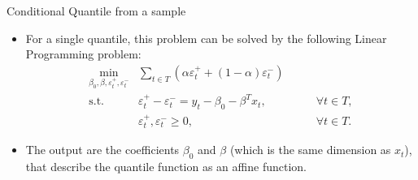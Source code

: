 \begin{frame}{Conditional Quantile from a sample}

\begin{itemize}
\tightlist
\item
  For a single quantile, this problem can be solved by the following
  Linear Programming problem: \[
  \begin{array}{lll}
   \underset{\beta_0, \beta,\varepsilon_{t}^{+}, \varepsilon_{t}^{-}}{\text{min}} & \sum_{t \in T} \left(\alpha \varepsilon_{t}^{+}+(1-\alpha)\varepsilon_{t}^{-}\right) & \\
  \mbox{s.t. } & \varepsilon_{t}^{+}-\varepsilon_{t}^{-}=y_{t} - \beta_{0} - \beta^T x_{t}, & \qquad\forall t \in T,\\
  & \varepsilon_t^+,\varepsilon_t^- \geq 0, & \qquad \forall t \in T.
  \end{array}
  \]
\item
  The output are the coefficients \(\beta_0\) and \(\beta\) (which is
  the same dimension as \(x_t\)), that describe the quantile function as
  an affine function.
\end{itemize}

\end{frame}

